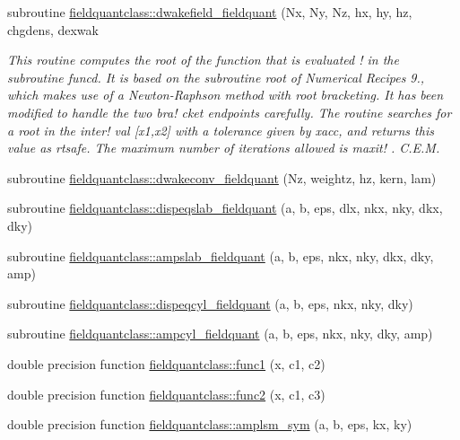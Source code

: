 \begin{DoxyCompactItemize}
\item 
subroutine \mbox{\hyperlink{namespacefieldquantclass_a990a046cc996cb957a94c4995bfe803a}{fieldquantclass\+::dwakefield\+\_\+fieldquant}} (Nx, Ny, Nz, hx, hy, hz, chgdens, dexwak
\begin{DoxyCompactList}\small\item\em This routine computes the root of the function that is evaluated ! in the subroutine \textquotesingle{}funcd\textquotesingle{}. It is based on the subroutine \textquotesingle{}root\textquotesingle{} of Numerical Recipes 9., which makes use of a Newton-\/\+Raphson method with root bracketing. It has been modified to handle the two bra! cket endpoints carefully. The routine searches for a root in the inter! val \mbox{[}x1,x2\mbox{]} with a tolerance given by \textquotesingle{}xacc\textquotesingle{}, and returns this value as \textquotesingle{}rtsafe\textquotesingle{}. The maximum number of iterations allowed is \textquotesingle{}maxit\textquotesingle{}! . C.\+E.\+M. \end{DoxyCompactList}\item 
subroutine \mbox{\hyperlink{namespacefieldquantclass_a80dd0228de4fecabda6f6696b098a11f}{fieldquantclass\+::dwakeconv\+\_\+fieldquant}} (Nz, weightz, hz, kern, lam)
\item 
subroutine \mbox{\hyperlink{namespacefieldquantclass_a362a63ffd1dbce47680a0224d88552c7}{fieldquantclass\+::dispeqslab\+\_\+fieldquant}} (a, b, eps, dlx, nkx, nky, dkx, dky)
\item 
subroutine \mbox{\hyperlink{namespacefieldquantclass_ac5166a3094bb6567db04903c1f43e4b6}{fieldquantclass\+::ampslab\+\_\+fieldquant}} (a, b, eps, nkx, nky, dkx, dky, amp)
\item 
subroutine \mbox{\hyperlink{namespacefieldquantclass_ac9b2b94f5051c235120e16bd55e0148d}{fieldquantclass\+::dispeqcyl\+\_\+fieldquant}} (a, b, eps, nkx, nky, dky)
\item 
subroutine \mbox{\hyperlink{namespacefieldquantclass_a0cf12c2453dd024814caca1b9dbbb9a5}{fieldquantclass\+::ampcyl\+\_\+fieldquant}} (a, b, eps, nkx, nky, dky, amp)
\item 
double precision function \mbox{\hyperlink{namespacefieldquantclass_a3979aaa9ea17b446b00cd5477dfd354e}{fieldquantclass\+::func1}} (x, c1, c2)
\item 
double precision function \mbox{\hyperlink{namespacefieldquantclass_a1758703e79afc95b20c7fd7261fa4afe}{fieldquantclass\+::func2}} (x, c1, c3)
\item 
double precision function \mbox{\hyperlink{namespacefieldquantclass_aaf0193e68163e6fb2bba0a9477f19cb0}{fieldquantclass\+::amplsm\+\_\+sym}} (a, b, eps, kx, ky)

\end{DoxyCompactItemize}
